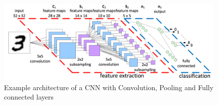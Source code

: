 \begin{figure}
    \centering
    \includegraphics[width=12cm]{Plots/cnn_example.png}
    \caption{Example architecture of a CNN with Convolution, Pooling and Fully connected layers}
    \label{fig:cnn_example}
\end{figure}
